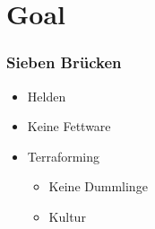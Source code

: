 \section{Goal}
%
\begin{frame}
	\frametitle{Sieben Brücken}
	\begin{itemize}
		\item Helden
		\item Keine Fettware
		\item Terraforming
		\begin{itemize}
			\item Keine Dummlinge
			\item Kultur
		\end{itemize}
	\end{itemize}
\end{frame}
